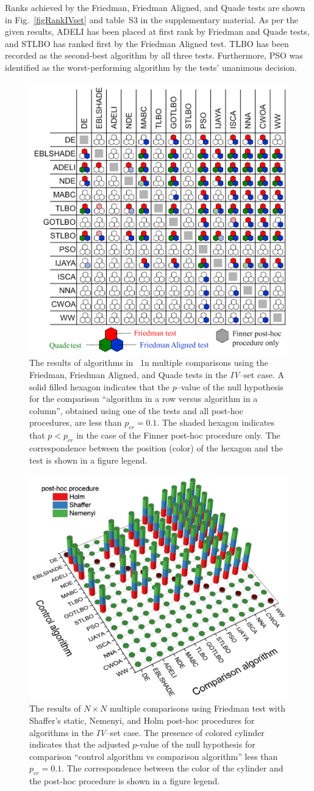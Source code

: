 \documentclass[a4paper,fleqn]{cas-sc}
\begin{document}
Ranks achieved by the Friedman, Friedman Aligned, and Quade tests are shown in Fig.~\ref{figRankIVset} and table~S3 in the supplementary material.
As per the given results, ADELI has been placed at first rank by Friedman and Quade tests,
and STLBO has ranked first by the Friedman Aligned test.
TLBO has been recorded as the second-best algorithm by all three tests.
Furthermore, PSO was identified as the worst-performing algorithm by the tests' unanimous decision.




\begin{figure}[]
	\centering
		\includegraphics[width=0.5\columnwidth]{Fig11}
	  \caption{
The results of algorithms in  1n multiple comparisons using the Friedman, Friedman Aligned,
and Quade tests in the \emph{IV}--set case.
A solid filled hexagon indicates that the $p$--value of the null hypothesis for the comparison
``algorithm in a row versus algorithm in a column'', obtained using one of the tests and all post-hoc procedures,
are less than $p_{cr}=0.1$.
The shaded hexagon indicates that $p<p_{cr}$ in the case of the Finner post-hoc procedure only.
The correspondence between the position (color) of the hexagon and the test is shown in a figure legend.
               }\label{figN1RezIVset}
\end{figure}


\begin{figure}[]
	\centering
		\includegraphics[width=0.5\columnwidth]{Fig12}
	  \caption{
The results of $N\times N$ multiple comparisons using Friedman test
with Shaffer’s static, Nemenyi, and Holm post-hoc procedures for algorithms in the \emph{IV}--set case.
The presence of colored cylinder indicates that the adjusted $p$-value of the null hypothesis
for comparison ``control algorithm vs comparison algorithm'' less than $p_{cr}=0.1$.
The correspondence between the color of the cylinder and the post-hoc procedure is shown in a figure legend.
               }\label{figNNRezIVset}
\end{figure}
\end{document}
